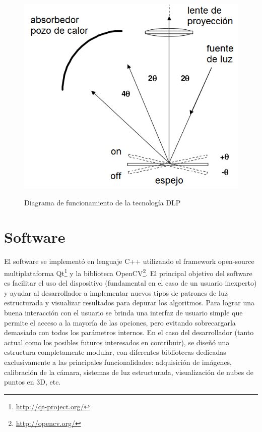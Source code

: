 \begin{figure}[!bth]
    \myfloatalign
        {\includegraphics[width=0.7\linewidth]{images/schema-dlp}}
        \caption{Diagrama de funcionamiento de la tecnología DLP}
        \label{fig:dlpMirrorOpticalDiagram}
\end{figure}


\section{Software}
El software se implementó en lenguaje C++ utilizando el framework open-source multiplataforma Qt\footnote{\url{http://qt-project.org/}} y la biblioteca OpenCV\footnote{\url{http://opencv.org/}}. El principal objetivo del software es facilitar el uso del dispositivo (fundamental en el caso de un usuario inexperto) y ayudar al desarrollador a implementar nuevos tipos de patrones de luz estructurada y visualizar resultados para depurar los algoritmos. 
Para lograr una buena interacción con el usuario se brinda una interfaz de usuario simple que permite el acceso a la mayoría de las opciones, pero evitando sobrecargarla demasiado con todos los parámetros internos.
En el caso del desarrollador (tanto actual como los posibles futuros interesados en contribuir), se diseñó una estructura completamente modular, con diferentes bibliotecas dedicadas exclusivamente a las principales funcionalidades: adquisición de imágenes, calibración de la cámara, sistemas de luz estructurada, visualización de nubes de puntos en 3D, etc.

